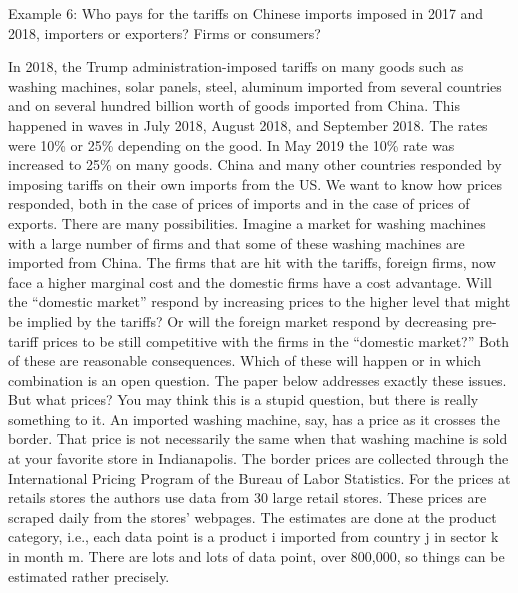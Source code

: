 \documentclass[
]{book}
\begin{document}
Example 6: Who pays for the tariffs on Chinese imports imposed in 2017 and 2018, importers or exporters? Firms or consumers?

In 2018, the Trump administration-imposed tariffs on many goods such as washing machines, solar panels, steel, aluminum imported from several countries and on several hundred billion worth of goods imported from China. This happened in waves in July 2018, August 2018, and September 2018. The rates were 10\% or 25\% depending on the good. In May 2019 the 10\% rate was increased to 25\% on many goods. China and many other countries responded by imposing tariffs on their own imports from the US.
We want to know how prices responded, both in the case of prices of imports and in the case of prices of exports.
There are many possibilities. Imagine a market for washing machines with a large number of firms and that some of these washing machines are imported from China. The firms that are hit with the tariffs, foreign firms, now face a higher marginal cost and the domestic firms have a cost advantage. Will the ``domestic market'' respond by increasing prices to the higher level that might be implied by the tariffs? Or will the foreign market respond by decreasing pre-tariff prices to be still competitive with the firms in the ``domestic market?'' Both of these are reasonable consequences. Which of these will happen or in which combination is an open question. The paper below addresses exactly these issues.
But what prices? You may think this is a stupid question, but there is really something to it.
An imported washing machine, say, has a price as it crosses the border. That price is not necessarily the same when that washing machine is sold at your favorite store in Indianapolis. The border prices are collected through the International Pricing Program of the Bureau of Labor Statistics.
For the prices at retails stores the authors use data from 30 large retail stores. These prices are scraped daily from the stores' webpages.
The estimates are done at the product category, i.e., each data point is a product i imported from country j in sector k in month m. There are lots and lots of data point, over 800,000, so things can be estimated rather precisely.
\end{document}
